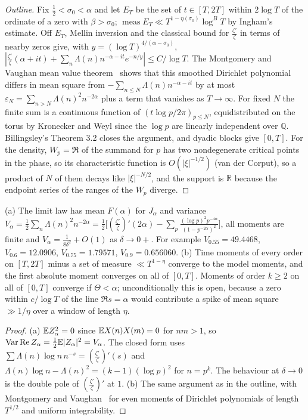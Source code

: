 \begin{proof}[Outline]
Fix $\frac12<\sigma_0<\alpha$ and let $E_T$ be the set of $t\in[T,2T]$ within $2\log T$ of the ordinate of a zero with $\beta>\sigma_0$; $\operatorname{meas}E_T\ll T^{1-\eta(\sigma_0)}\log^{B}T$ by Ingham's estimate. Off $E_T$, Mellin inversion and the classical bound for $\frac{\zeta'}{\zeta}$ in terms of nearby zeros give, with $y=(\log T)^{4/(\alpha-\sigma_0)}$, $|\frac{\zeta'}{\zeta}(\alpha+it)+\sum_n\Lambda(n)n^{-\alpha-it}e^{-n/y}|\le C/\log T$. The Montgomery and Vaughan mean value theorem~\cite{MV74} shows that this smoothed Dirichlet polynomial differs in mean square from $-\sum_{n\le N}\Lambda(n)n^{-\alpha-it}$ by at most $\varepsilon_N=\sum_{n>N}\Lambda(n)^2n^{-2\alpha}$ plus a term that vanishes as $T\to\infty$. For fixed $N$ the finite sum is a continuous function of $(t\log p/2\pi)_{p\le N}$, equidistributed on the torus by Kronecker and Weyl since the $\log p$ are linearly independent over $\mathbb Q$. Billingsley's Theorem 3.2 closes the argument, and dyadic blocks give $[0,T]$. For the density, $W_p=\Re$ of the summand for $p$ has two nondegenerate critical points in the phase, so its characteristic function is $O(|\xi|^{-1/2})$ (van der Corput), so a product of $N$ of them decays like $|\xi|^{-N/2}$, and the support is $\mathbb R$ because the endpoint series of the ranges of the $W_p$ diverge. %
\end{proof}

\begin{proposition}\label{bo:prop:meanvar}
(a) The limit law has mean $F(\alpha)$ for $J_\alpha$ and variance $V_\alpha=\frac12\sum_n\Lambda(n)^2n^{-2\alpha}=\frac12\bigl[(\frac{\zeta'}{\zeta})'(2\alpha)-\sum_p\frac{(\log p)^2p^{-4\alpha}}{(1-p^{-2\alpha})^2}\bigr]$, all moments are finite and $V_\alpha=\frac1{8\delta^2}+O(1)$ as $\delta\to0+$. For example $V_{0.55}=49.4468$, $V_{0.6}=12.0906$, $V_{0.75}=1.79571$, $V_{0.9}=0.656060$. (b) Time moments of every order on $[T,2T]$ minus a set of measure $\ll T^{1-\eta}$ converge to the model moments, and the first absolute moment converges on all of $[0,T]$. Moments of order $k\ge2$ on all of $[0,T]$ converge if $\Theta<\alpha$; unconditionally this is open, because a zero within $c/\log T$ of the line $\Re s=\alpha$ would contribute a spike of mean square $\gg1/\eta$ over a window of length $\eta$.
\end{proposition}

\begin{proof}
(a) $\mathbb{E} Z_\alpha^2=0$ since $\mathbb{E} X(n)X(m)=0$ for $nm>1$, so $\operatorname{Var}\operatorname{Re} Z_\alpha=\frac12\mathbb{E}|Z_\alpha|^2=V_\alpha$. The closed form uses $\sum\Lambda(n)\log n\,n^{-s}=(\frac{\zeta'}{\zeta})'(s)$ and $\Lambda(n)\log n-\Lambda(n)^2=(k-1)(\log p)^2$ for $n=p^k$. The behaviour at $\delta\to0$ is the double pole of $(\frac{\zeta'}{\zeta})'$ at $1$. (b) The same argument as in the outline, with Montgomery and Vaughan~\cite{MV74} for even moments of Dirichlet polynomials of length $T^{1/2}$ and uniform integrability.
\end{proof}

